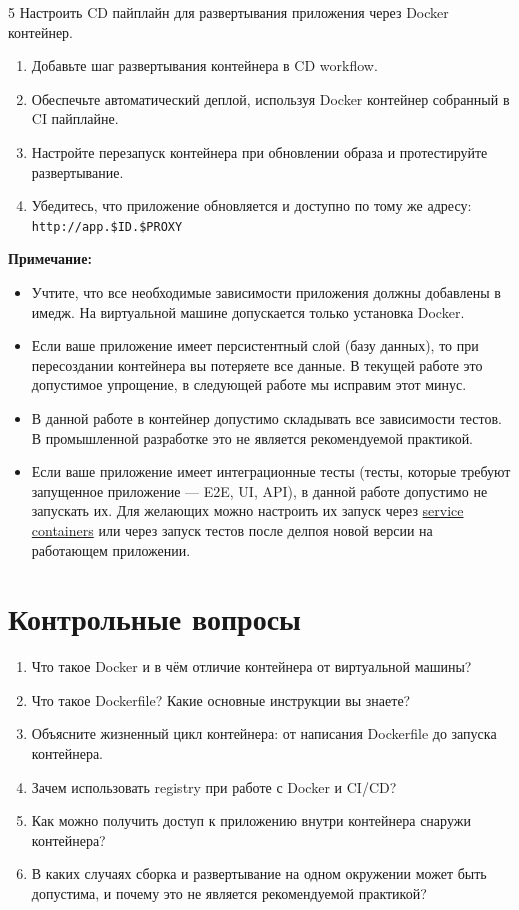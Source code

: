 \documentclass[12pt,a4paper]{article}
\begin{document}
\begin{task}{5}
    Настроить CD пайплайн для развертывания приложения через Docker контейнер.

    \begin{enumerate}
        \item Добавьте шаг развертывания контейнера в CD workflow.
        \item Обеспечьте автоматический деплой, используя Docker контейнер собранный в CI пайплайне.
        \item Настройте перезапуск контейнера при обновлении образа и протестируйте развертывание.
        \item Убедитесь, что приложение обновляется и доступно по тому же адресу: \texttt{http://app.\$ID.\$PROXY}
    \end{enumerate}
\end{task}

\textbf{Примечание:}
\begin{itemize}
    \item Учтите, что все необходимые зависимости приложения должны добавлены в имедж. На виртуальной машине допускается только установка Docker.
    \item Если ваше приложение имеет персистентный слой (базу данных), то при пересоздании контейнера вы потеряете все данные. В текущей работе это допустимое упрощение, в следующей работе мы исправим этот минус.
    \item В данной работе в контейнер допустимо складывать все зависимости тестов. В промышленной разработке это не является рекомендуемой практикой.
    \item Если ваше приложение имеет интеграционные тесты (тесты, которые требуют запущенное приложение — E2E, UI, API), в данной работе допустимо не запускать их. Для желающих можно настроить их запуск через \href{https://docs.github.com/en/actions/tutorials/use-containerized-services/use-docker-service-containers}{service containers} или через запуск тестов после делпоя новой версии на работающем приложении.
\end{itemize}

\section{Контрольные вопросы}
\begin{enumerate}
    \item Что такое Docker и в чём отличие контейнера от виртуальной машины?
    \item Что такое Dockerfile? Какие основные инструкции вы знаете?
    \item Объясните жизненный цикл контейнера: от написания Dockerfile до запуска контейнера.
    \item Зачем использовать registry при работе с Docker и CI/CD?
    \item Как можно получить доступ к приложению внутри контейнера снаружи контейнера?
    \item В каких случаях сборка и развертывание на одном окружении может быть допустима, и почему это не является рекомендуемой практикой?
\end{enumerate}
\end{document}
